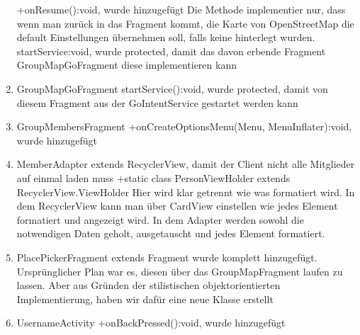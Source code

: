 \begin{enumerate}
	+onResume():void, wurde hinzugefügt Die Methode implementier nur, dass wenn man zurück in das Fragment kommt, die Karte von OpenStreetMap die default Einstellungen übernehmen soll, falls keine hinterlegt wurden.	
	startService:void, wurde protected, damit das davon erbende Fragment GroupMapGoFragment diese implementieren kann		
	\item GroupMapGoFragment
	startService():void, wurde protected, damit von diesem Fragment aus der GoIntentService gestartet werden kann
	\item GroupMembersFragment
	+onCreateOptionsMenu(Menu, MenuInflater):void, wurde hinzugefügt
	\item MemberAdapter
	extends RecyclerView, damit der Client nicht alle Mitglieder auf einmal laden muss
	+static class PersonViewHolder extends RecyclerView.ViewHolder Hier wird klar getrennt wie was formatiert wird. In dem RecyclerView kann man über CardView einstellen wie jedes Element formatiert und angezeigt wird. In dem Adapter werden sowohl die notwendigen Daten geholt, ausgetauscht und jedes Element formatiert.
	\item PlacePickerFragment extends Fragment
	wurde komplett hinzugefügt. Ursprünglicher Plan war es, diesen über das GroupMapFragment laufen zu lassen. Aber aus Gründen der stilistischen objektorientierten Implementierung, haben wir dafür eine neue Klasse erstellt
	\item UsernameActivity
	+onBackPressed():void, wurde hinzugefügt
	
\end{enumerate}







